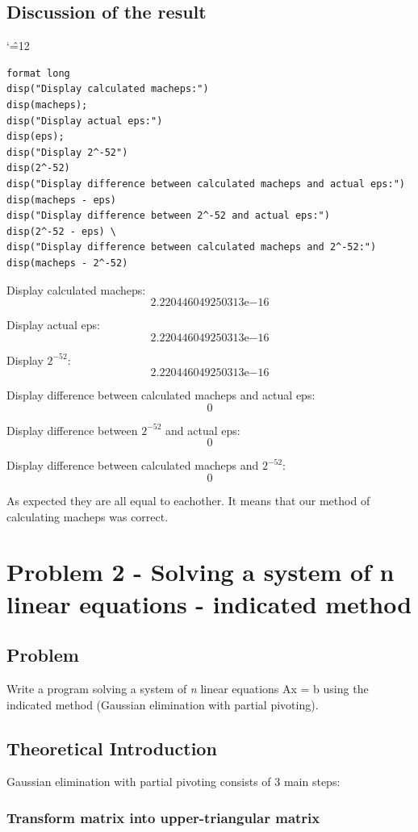 \documentclass[12pt]{report}
\newenvironment{simplechar}{%
   \catcode`\^=12
}{}
\begin{document}
\section{Discussion of the result}
\begin{simplechar}
\begin{lstlisting}
format long
disp("Display calculated macheps:")
disp(macheps);
disp("Display actual eps:")
disp(eps);
disp("Display 2^-52")
disp(2^-52)
disp("Display difference between calculated macheps and actual eps:")
disp(macheps - eps)
disp("Display difference between 2^-52 and actual eps:")
disp(2^-52 - eps) \
disp("Display difference between calculated macheps and 2^-52:")
disp(macheps - 2^-52)
\end{lstlisting}
\end{simplechar}
Display calculated macheps:
     \[2.220446049250313\mathrm{e}{-16}\]

Display actual eps:
     \[2.220446049250313\mathrm{e}{-16}\]

Display $2^{-52}$:
     \[2.220446049250313\mathrm{e}{-16}\]

Display difference between calculated macheps and actual eps:
     \[0\]

Display difference between $2^{-52}$ and actual eps:
          \[0\]

Display difference between calculated macheps and $2^{-52}$:
         \[0\]

As expected they are all equal to eachother. It means that our method of calculating macheps was correct.

\chapter{Problem 2 - Solving a system of n linear equations - indicated method}

\section{Problem}
Write a program solving a system of \textit{n} linear equations Ax = b using the indicated method (Gaussian elimination with partial pivoting).

\section{Theoretical Introduction}
Gaussian elimination with partial pivoting consists of 3 main steps:
\subsection{Transform matrix into upper-triangular matrix}
\end{document}
